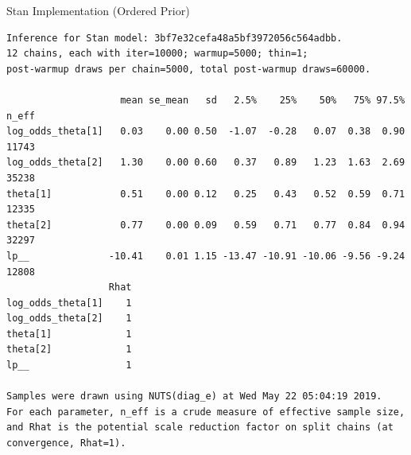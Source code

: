 \documentclass[dvipdfmx,bigger,aspectratio=169]{beamer}
\begin{document}
\begin{frame}[fragile,allowframebreaks,label=,t]{Stan Implementation (Ordered Prior)}
\normalsize
\scriptsize
\normalsize
\scriptsize
\begin{verbatim}
Inference for Stan model: 3bf7e32cefa48a5bf3972056c564adbb.
12 chains, each with iter=10000; warmup=5000; thin=1; 
post-warmup draws per chain=5000, total post-warmup draws=60000.

                    mean se_mean   sd   2.5%    25%    50%   75% 97.5% n_eff
log_odds_theta[1]   0.03    0.00 0.50  -1.07  -0.28   0.07  0.38  0.90 11743
log_odds_theta[2]   1.30    0.00 0.60   0.37   0.89   1.23  1.63  2.69 35238
theta[1]            0.51    0.00 0.12   0.25   0.43   0.52  0.59  0.71 12335
theta[2]            0.77    0.00 0.09   0.59   0.71   0.77  0.84  0.94 32297
lp__              -10.41    0.01 1.15 -13.47 -10.91 -10.06 -9.56 -9.24 12808
                  Rhat
log_odds_theta[1]    1
log_odds_theta[2]    1
theta[1]             1
theta[2]             1
lp__                 1

Samples were drawn using NUTS(diag_e) at Wed May 22 05:04:19 2019.
For each parameter, n_eff is a crude measure of effective sample size,
and Rhat is the potential scale reduction factor on split chains (at 
convergence, Rhat=1).
\end{verbatim}

\normalsize
\end{frame}
\end{document}
